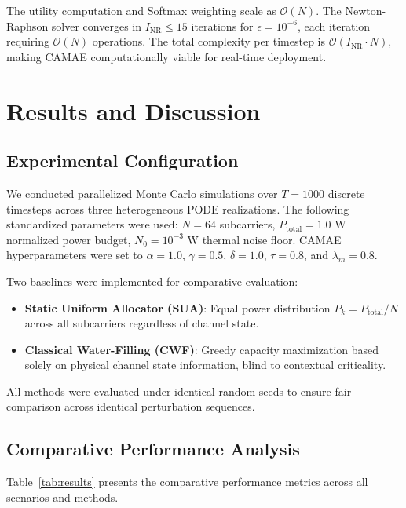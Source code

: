 \documentclass[journal,10pt,twocolumn,twoside]{IEEEtran}
\begin{document}
The utility computation and Softmax weighting scale as $\mathcal{O}(N)$. The Newton-Raphson solver converges in $I_{\text{NR}} \leq 15$ iterations for $\epsilon = 10^{-6}$, each iteration requiring $\mathcal{O}(N)$ operations. The total complexity per timestep is $\mathcal{O}(I_{\text{NR}} \cdot N)$, making CAMAE computationally viable for real-time deployment.

\section{Results and Discussion}
\label{sec:results}

\subsection{Experimental Configuration}

We conducted parallelized Monte Carlo simulations over $T = 1000$ discrete timesteps across three heterogeneous PODE realizations. The following standardized parameters were used: $N = 64$ subcarriers, $P_{\text{total}} = 1.0$ W normalized power budget, $N_0 = 10^{-3}$ W thermal noise floor. CAMAE hyperparameters were set to $\alpha = 1.0$, $\gamma = 0.5$, $\delta = 1.0$, $\tau = 0.8$, and $\lambda_m = 0.8$.

Two baselines were implemented for comparative evaluation:

\begin{itemize}
    \item \textbf{Static Uniform Allocator (SUA)}: Equal power distribution $P_k = P_{\text{total}} / N$ across all subcarriers regardless of channel state.
    \item \textbf{Classical Water-Filling (CWF)}: Greedy capacity maximization based solely on physical channel state information, blind to contextual criticality.
\end{itemize}

All methods were evaluated under identical random seeds to ensure fair comparison across identical perturbation sequences.

\subsection{Comparative Performance Analysis}

Table~\ref{tab:results} presents the comparative performance metrics across all scenarios and methods.
\end{document}
